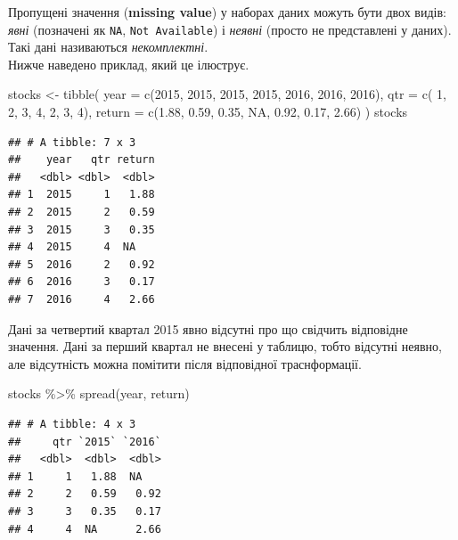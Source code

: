 \documentclass[
]{book}
\newenvironment{Shaded}{\begin{snugshade}}{\end{snugshade}}
\newcommand{\AttributeTok}[1]{\textcolor[rgb]{0.77,0.63,0.00}{#1}}
\newcommand{\ConstantTok}[1]{\textcolor[rgb]{0.00,0.00,0.00}{#1}}
\newcommand{\DecValTok}[1]{\textcolor[rgb]{0.00,0.00,0.81}{#1}}
\newcommand{\FloatTok}[1]{\textcolor[rgb]{0.00,0.00,0.81}{#1}}
\newcommand{\FunctionTok}[1]{\textcolor[rgb]{0.00,0.00,0.00}{#1}}
\newcommand{\NormalTok}[1]{#1}
\newcommand{\OtherTok}[1]{\textcolor[rgb]{0.56,0.35,0.01}{#1}}
\newcommand{\SpecialCharTok}[1]{\textcolor[rgb]{0.00,0.00,0.00}{#1}}
\begin{document}
Пропущені значення (\textbf{missing value}) у наборах даних можуть бути двох видів: \emph{явні} (позначені як \texttt{NA}, \texttt{Not\ Available}) і \emph{неявні} (просто не представлені у даних). Такі дані називаються \emph{некомплектні}.\\
Нижче наведено приклад, який це ілюструє.

\begin{Shaded}
\begin{Highlighting}[]
\NormalTok{stocks }\OtherTok{\textless{}{-}} \FunctionTok{tibble}\NormalTok{(}
  \AttributeTok{year   =} \FunctionTok{c}\NormalTok{(}\DecValTok{2015}\NormalTok{, }\DecValTok{2015}\NormalTok{, }\DecValTok{2015}\NormalTok{, }\DecValTok{2015}\NormalTok{, }\DecValTok{2016}\NormalTok{, }\DecValTok{2016}\NormalTok{, }\DecValTok{2016}\NormalTok{),}
  \AttributeTok{qtr    =} \FunctionTok{c}\NormalTok{(   }\DecValTok{1}\NormalTok{,    }\DecValTok{2}\NormalTok{,    }\DecValTok{3}\NormalTok{,    }\DecValTok{4}\NormalTok{,    }\DecValTok{2}\NormalTok{,    }\DecValTok{3}\NormalTok{,    }\DecValTok{4}\NormalTok{),}
  \AttributeTok{return =} \FunctionTok{c}\NormalTok{(}\FloatTok{1.88}\NormalTok{, }\FloatTok{0.59}\NormalTok{, }\FloatTok{0.35}\NormalTok{,   }\ConstantTok{NA}\NormalTok{, }\FloatTok{0.92}\NormalTok{, }\FloatTok{0.17}\NormalTok{, }\FloatTok{2.66}\NormalTok{)}
\NormalTok{)}
\NormalTok{stocks}
\end{Highlighting}
\end{Shaded}

\begin{verbatim}
## # A tibble: 7 x 3
##    year   qtr return
##   <dbl> <dbl>  <dbl>
## 1  2015     1   1.88
## 2  2015     2   0.59
## 3  2015     3   0.35
## 4  2015     4  NA   
## 5  2016     2   0.92
## 6  2016     3   0.17
## 7  2016     4   2.66
\end{verbatim}

Дані за четвертий квартал 2015 явно відсутні про що свідчить відповідне значення. Дані за перший квартал не внесені у таблицю, тобто відсутні неявно, але відсутність можна помітити після відповідної траснформації.

\begin{Shaded}
\begin{Highlighting}[]
\NormalTok{stocks }\SpecialCharTok{\%\textgreater{}\%} 
  \FunctionTok{spread}\NormalTok{(year, return)}
\end{Highlighting}
\end{Shaded}

\begin{verbatim}
## # A tibble: 4 x 3
##     qtr `2015` `2016`
##   <dbl>  <dbl>  <dbl>
## 1     1   1.88  NA   
## 2     2   0.59   0.92
## 3     3   0.35   0.17
## 4     4  NA      2.66
\end{verbatim}
\end{document}
